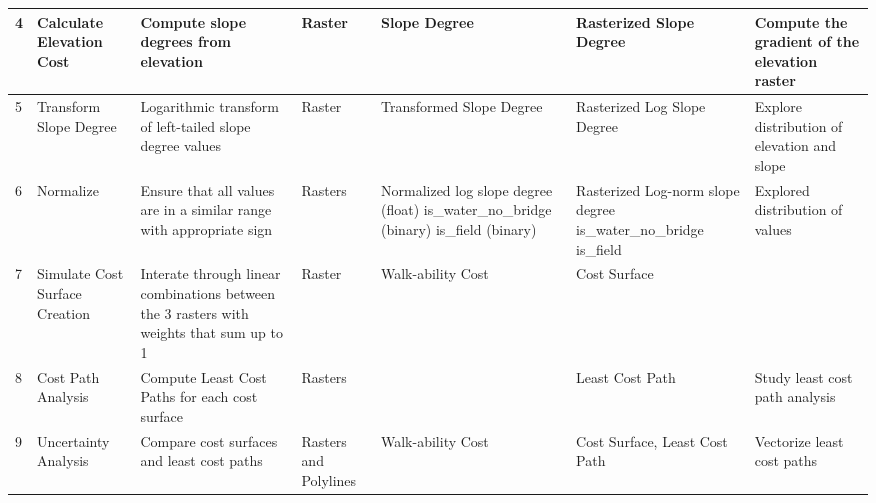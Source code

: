 \documentclass[article,12pt]{article}
\numberwithin{equation}{section}
\begin{document}
\begin{adjustwidth}{-.88in}{-.88in}
{\begin{tabular}{|l|p{.09\linewidth}|p{.17\linewidth}|p{.065\linewidth}|p{.1\linewidth}|p{.28\linewidth}|p{.15\linewidth}|}
		4 & Calculate Elevation Cost & Compute slope degrees from elevation              &    Raster                                     &   Slope Degree                                                & Rasterized Slope Degree                                                                                                                                                                                                        & Compute the gradient of the elevation raster            \\ \hline
		5 &  Transform Slope Degree & Logarithmic transform of left-tailed slope degree values & Raster & Transformed Slope Degree & Rasterized Log Slope Degree & Explore distribution of elevation and slope \\ \hline
		6 & Normalize     & Ensure that all values are in a similar range with appropriate sign                                                           & Rasters         &  Normalized log slope degree (float) \newline is\_water\_no\_bridge (binary) \newline is\_field (binary)                                               &         Rasterized Log-norm slope degree \newline is\_water\_no\_bridge \newline is\_field                                                                                                       &       Explored distribution of values \\ \hline
		7 & Simulate Cost Surface Creation                            & Interate through linear combinations between the 3 rasters with weights that sum up to 1 &    Raster               &     Walk-ability Cost                                             &    Cost Surface                                                                                                                                        &             \\ \hline
		8 & Cost Path Analysis &   Compute Least Cost Paths for each cost surface            &  Rasters                                       &                                                  &    Least Cost Path                                                                                                                                                                                                     &   Study least cost path analysis           \\ \hline
		9 & Uncertainty Analysis & Compare cost surfaces and least cost paths              &    Rasters and Polylines                                     &  Walk-ability Cost                                                 &   Cost Surface, Least Cost Path                                                                                                                                                                                                    &  Vectorize least cost paths           \\ \hline      

\end{tabular}}
\end{adjustwidth}
\end{document}
